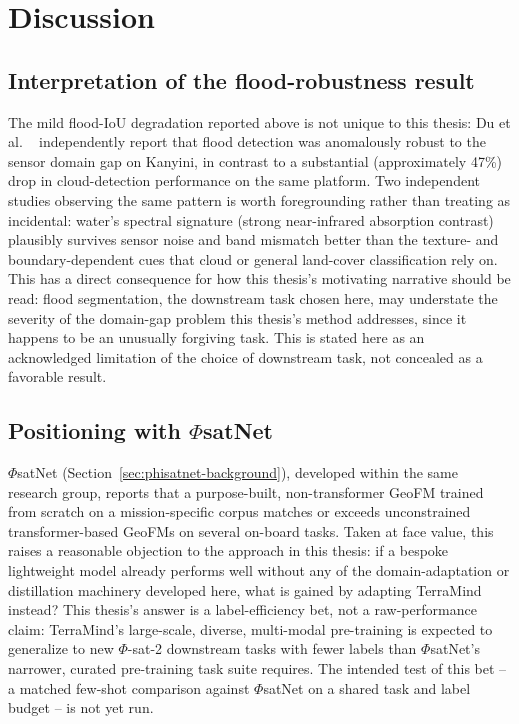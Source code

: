 \section{Discussion}
\label{sec:discussion}

\subsection{Interpretation of the flood-robustness result}
\label{sec:discussion-comparison}

The mild flood-IoU degradation reported above is not unique to this thesis: Du et al.
\ \cite{du2025onorbitdemonstrationgeospatialfoundation} independently report that flood detection was anomalously robust to the sensor domain gap on Kanyini, in contrast to a substantial (approximately 47\%) drop in cloud-detection performance on the same platform.
Two independent studies observing the same pattern is worth foregrounding rather than treating as incidental: water's spectral signature (strong near-infrared absorption contrast) plausibly survives sensor noise and band mismatch better than the texture- and boundary-dependent cues that cloud or general land-cover classification rely on.
This has a direct consequence for how this thesis's motivating narrative should be read: flood segmentation, the downstream task chosen here, may understate the severity of the domain-gap problem this thesis's method addresses, since it happens to be an unusually forgiving task.
This is stated here as an acknowledged limitation of the choice of downstream task, not concealed as a favorable result.

\subsection{Positioning with $\Phi$satNet}

$\Phi$satNet (Section~\ref{sec:phisatnet-background}), developed within the same research group, reports that a purpose-built, non-transformer GeoFM trained from scratch on a mission-specific corpus matches or exceeds unconstrained transformer-based GeoFMs on several on-board tasks.
Taken at face value, this raises a reasonable objection to the approach in this thesis: if a bespoke lightweight model already performs well without any of the domain-adaptation or distillation machinery developed here, what is gained by adapting TerraMind instead?
This thesis's answer is a label-efficiency bet, not a raw-performance claim: TerraMind's large-scale, diverse, multi-modal pre-training is expected to generalize to new $\Phi$-sat-2 downstream tasks with fewer labels than $\Phi$satNet's narrower, curated pre-training task suite requires.
The intended test of this bet -- a matched few-shot comparison against $\Phi$satNet on a shared task and label budget -- is not yet run.

